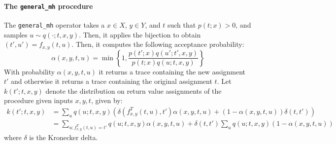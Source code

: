 \documentclass{article}
\begin{document}
\paragraph{The \texttt{general\_mh} procedure}
The \texttt{general\_mh} operator takes a $x \in X$, $y \in Y$, and $t$ such that $p(t; x) > 0$, and samples $u \sim q(\cdot; t, x, y)$.
Then, it applies the bijection to obtain $(t', u') = f_{x,y}(t, u)$.
Then, it computes the following acceptance probability:
\[
\alpha(x, y, t, u) = \min\left\{ 1, \frac{p(t'; x) q(u'; t', x, y)}{p(t; x) q(u; t, x, y)} \right\}
\]
With probability $\alpha(x, y, t, u)$ it returns a trace containing the new assignment $t'$ and otherwise it returns a trace containing the original assignment $t$.
Let $k(t'; t, x, y)$ denote the distribution on return value assignments of the procedure given inputs $x, y, t$, given by:
\begin{align}
    k(t'; t, x, y)
    &= \sum_{u} q(u; t, x, y) \left( \delta(f^T_{x,y}(t, u), t') \alpha(x, y, t, u) + (1 - \alpha(x, y, t, u)) \delta(t, t') \right)\\
    &= \sum_{u : f^T_{x,y}(t, u) = t'} q(u; t, x, y) \alpha(x, y, t, u) + \delta(t, t') \sum_u q(u; t, x, y) (1 - \alpha(x, y, t, u))
\end{align}
where $\delta$ is the Kronecker delta.
\end{document}
